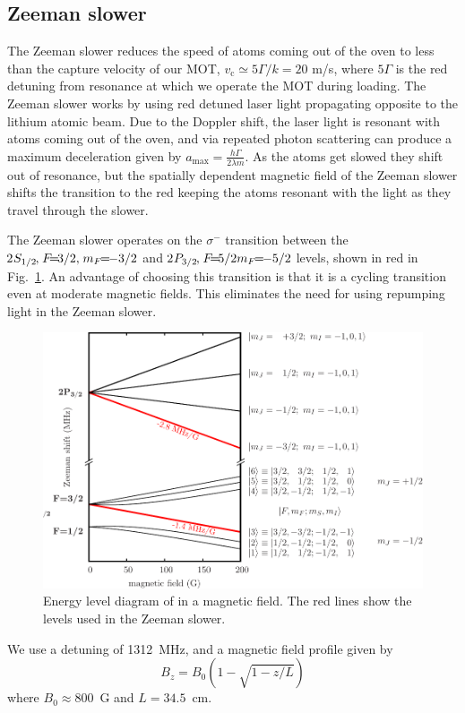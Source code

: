 	
\subsection{Zeeman slower}
\label{subsec:zeemanslower}
The Zeeman slower reduces the speed of atoms coming out of the oven to less
than the capture velocity of our MOT, $v_{\mathrm{c}}\simeq 5\Gamma/k = 20$
m/s, where $5\Gamma$ is the red detuning from resonance at which we operate the
MOT during loading. The Zeeman slower works by using red detuned laser light
propagating opposite to the lithium atomic beam.  Due to the Doppler shift, the
laser light is resonant with atoms coming out of the oven, and via repeated
photon scattering can produce a maximum deceleration given by $a_{\mathrm{max}}
= \frac{h\Gamma}{2\lambda m}$.  As the atoms get slowed they shift out of
resonance, but the spatially dependent magnetic field of the Zeeman slower
shifts the transition to the red keeping the atoms resonant with the light as
they travel through the slower.

The Zeeman slower operates on the $\sigma^{-}$  transition between the
$\twos{1/2}\cm\f{3/2}\cm\mf{-3/2}$ and $\twop{3/2}\cm\f{5/2}\mf{-5/2}$ levels,
shown in red in Fig.~\ref{fig:zeemanlevels}. An advantage of choosing this
transition is that it is a cycling transition even at moderate magnetic fields.
This eliminates the need for using repumping light in the Zeeman slower.  
\begin{figure}
\centering
\includegraphics[width=1.0\textwidth]{../masters-figures/levels/zeeman_revised/01eps.pdf}
\caption[Levels of \li in a magnetic field. ]{\small Energy level diagram of
\li in a magnetic field.   The red lines show the levels used in the Zeeman
slower.  } \label{fig:zeemanlevels} 
\end{figure} 
We use a detuning of 1312~MHz, and a magnetic field profile given by \[ B_{z} =
B_{0}(1-\sqrt{1-z/L}) \] where $B_{0}\approx800$~G and $L=34.5$~cm.   



